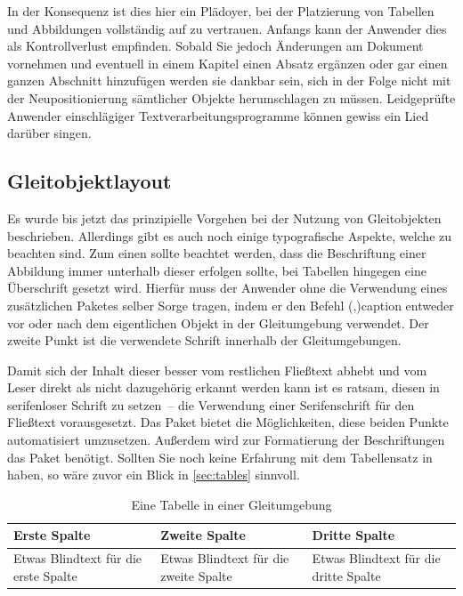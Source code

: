 \documentclass[%
  english,ngerman,%
  cdgeometry=no,DIV=12,%
  cd=false,cdfont=false,cdtitle=true,%
  headings=normal,%
  automark,%
  listof=toc,%
]{tudscrartcl}
\begin{document}
In der Konsequenz ist dies hier ein Plädoyer, bei der Platzierung von Tabellen 
und Abbildungen vollständig auf  zu vertrauen. Anfangs kann 
der Anwender dies als Kontrollverlust empfinden. Sobald Sie jedoch Änderungen 
am Dokument vornehmen und eventuell in einem Kapitel einen Absatz ergänzen oder 
gar einen ganzen Abschnitt hinzufügen werden sie dankbar sein, sich in der 
Folge nicht mit der Neupositionierung sämtlicher Objekte herumschlagen zu 
müssen. Leidgeprüfte Anwender einschlägiger Textverarbeitungsprogramme können 
gewiss ein Lied darüber singen.



\subsection{%
  Gleitobjektlayout%
  \label{sec:floatlayout}%
}

Es wurde bis jetzt das prinzipielle Vorgehen bei der Nutzung von Gleitobjekten 
beschrieben. Allerdings gibt es auch noch einige typografische Aspekte, welche 
zu beachten sind. Zum einen sollte beachtet werden, dass die Beschriftung einer 
Abbildung immer unterhalb dieser erfolgen sollte, bei Tabellen hingegen eine 
Überschrift gesetzt wird. Hierfür muss der Anwender ohne die Verwendung eines 
zusätzlichen Paketes selber Sorge tragen, indem er den Befehl 
\Macro(,){caption} entweder vor oder 
nach dem eigentlichen Objekt in der Gleitumgebung verwendet. Der zweite Punkt 
ist die verwendete Schrift innerhalb der Gleitumgebungen. 

Damit sich der Inhalt dieser besser vom restlichen Fließtext abhebt und vom 
Leser direkt als nicht dazugehörig erkannt werden kann ist es ratsam, diesen in 
serifenloser Schrift zu setzen~-- die Verwendung einer Serifenschrift für den 
Fließtext vorausgesetzt. Das Paket  bietet die Möglichkeiten, 
diese beiden Punkte automatisiert umzusetzen. Außerdem wird zur Formatierung 
der Beschriftungen das Paket  benötigt. Sollten Sie noch keine 
Erfahrung mit dem Tabellensatz in  haben, so wäre zuvor ein 
Blick in \autoref{sec:tables} sinnvoll. 

\newcommand*\tableexample[1][]{%
  \begin{tabularx}{.75\textwidth}{@{}XXX@{}}
  \toprule
  \textbf{Erste Spalte} & \textbf{Zweite Spalte} & 
  \textbf{Dritte Spalte} \tabularnewline\midrule
  Etwas Blindtext für die erste Spalte &
  Etwas Blindtext für die zweite Spalte &
  Etwas Blindtext für die dritte Spalte
  \tabularnewline\bottomrule
  \end{tabularx}
  #1%
}
\begin{table}
\tableexample[%
  \caption{%
    Eine Tabelle in einer Gleitumgebung%
    \label{tab:tabular}%
  }%
]
\end{table}
\end{document}
